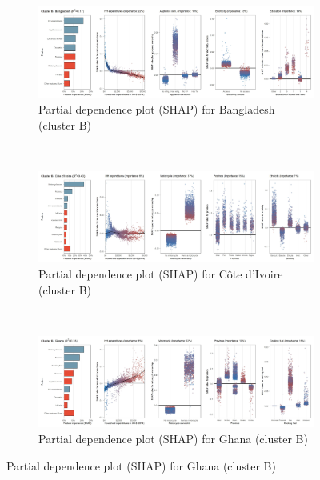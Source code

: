 \begin{figure}[ht!]\ContinuedFloat
    \centering
   \begin{subfigure}[b]{\textwidth}
   \centering
         \caption{Partial dependence plot (SHAP) for Bangladesh (cluster B)}
         \label{fig:5b_BGD}
         \includegraphics[width=\textwidth]{Figure 5b/Figure_5b_BGD} 
         \end{subfigure}
    \\
    \vspace{0.5cm}
   \begin{subfigure}[b]{\textwidth}        
   \centering
         \caption{Partial dependence plot (SHAP) for Côte d'Ivoire (cluster B)}
         \label{fig:5b_CIV}
         \includegraphics[width=\textwidth]{Figure 5b/Figure_5b_CIV}
         \end{subfigure}
    \\
    \vspace{0.5cm}
   \begin{subfigure}[b]{\textwidth}
   \centering
         \caption{Partial dependence plot (SHAP) for Ghana (cluster B)}
         \label{fig:5b_GHA}
         \includegraphics[width=\textwidth]{Figure 5b/Figure_5b_GHA}

\end{subfigure}
\end{figure}
